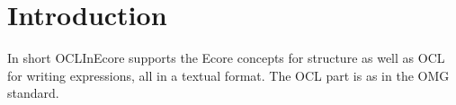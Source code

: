 
\section{Introduction}
\label{sec:introduction}

In short OCLInEcore supports the Ecore concepts for structure
as well as OCL for writing expressions, all in a textual format.
The OCL part is as in the OMG standard.